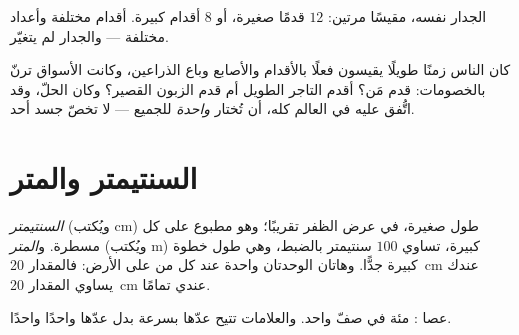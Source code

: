 \begin{omfigure}

{\small الجدار نفسه، مقيسًا مرتين: $12$ قدمًا صغيرة، أو $8$ أقدام
كبيرة. أقدام مختلفة وأعداد مختلفة --- والجدار لم يتغيّر.}
\end{omfigure}

\begin{remark}\label{rem:g2:measuring-length:argument}
كان الناس زمنًا طويلًا يقيسون فعلًا بالأقدام والأصابع وباع
الذراعين، وكانت الأسواق ترنّ بالخصومات: قدم مَن؟ أقدم التاجر
الطويل أم قدم الزبون القصير؟ وكان الحلّ، وقد اتُّفق عليه في العالم
كله، أن تُختار  \emph{واحدة} للجميع ---  لا تخصّ جسد
أحد.
\end{remark}

\section{السنتيمتر والمتر}

\begin{definition}\label{def:g2:measuring-length:units}
\emph{السنتيمتر} (ويُكتب \unit{cm})  طول صغيرة،
في عرض الظفر تقريبًا؛ وهو مطبوع على كل مسطرة.
و\emph{المتر} (ويُكتب \unit{m})  كبيرة، تساوي $100$
سنتيمتر بالضبط، وهي طول خطوة كبيرة جدًّا. وهاتان الوحدتان واحدة
عند كل من على الأرض: فالمقدار \qty{20}{cm} عندك يساوي المقدار
\qty{20}{cm} عندي تمامًا.
\end{definition}

\begin{omfigure}

{\small عصا : مئة  في صفّ واحد. والعلامات تتيح عدّها
بسرعة بدل عدّها واحدًا واحدًا.}
\end{omfigure}

